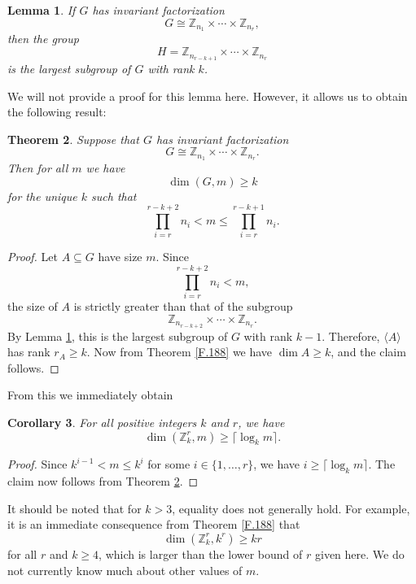 \documentclass[11pt]{article}
\newcommand{\Z}{\mathbb{Z}}
\newtheorem{thm}{Theorem}
\newtheorem{lem}[thm]{Lemma}
\newtheorem{cor}[thm]{Corollary}
\begin{document}
\begin{lem}\label{subgroup}
If $G$ has invariant factorization
\[G\cong\Z_{n_1}\times\cdots\times\Z_{n_r},\]
then the group
\[H=\Z_{n_{r-k+1}}\times\cdots\times\Z_{n_r}\]
\vspace{-1.5em}
\noindent is the largest subgroup of $G$ with rank $k$.
\end{lem}
\vspace{1.5em}
We will not provide a proof for this lemma here. However, it allows us to obtain the following result:
\begin{thm}\label{lower}
Suppose that $G$ has invariant factorization
\[G\cong\Z_{n_1}\times\cdots\times\Z_{n_r}.\]
Then for all $m$ we have
\[\dim(G, m)\geq k\]
for the unique $k$ such that 
\[\prod_{i=r}^{r-k+2}\!n_i<m\leq\prod_{i=r}^{r-k+1}\!n_i.\]
\end{thm}
\begin{proof}
    Let $A\subseteq G$ have size $m$. Since
    \[\prod_{i=r}^{r-k+2}\!n_i<m,\]
    the size of $A$ is strictly greater than that of the subgroup
    \[\Z_{n_{r-k+2}}\times\cdots\times\Z_{n_r}.\]
    By Lemma \ref{subgroup}, this is the largest subgroup of $G$ with rank $k-1$. Therefore, $\langle A \rangle$ has rank $r_A\geq k$. Now from Theorem \ref{F.188} we have $\dim A\geq k$, and the claim follows.
\end{proof}

\newpage
From this we immediately obtain

\begin{cor}\label{Zkr}
For all positive integers $k$ and $r$, we have
\[\dim(\Z_k^r,m)\geq \lceil \log_k m\rceil.\]
\end{cor}
\begin{proof}
Since $k^{i-1}<m\leq k^i$ for some $i\in\{1,\ldots,r\}$, we have $i\geq\lceil\log_k m\rceil$. The claim now follows from Theorem \ref{lower}.
\end{proof}

It should be noted that for $k>3$, equality does not generally hold. For example, it is an immediate consequence from Theorem \ref{F.188} that
\[\dim(\Z_k^r,k^r)\geq kr\]
for all $r$ and $k\geq4$, which is larger than the lower bound of $r$ given here. We do not currently know much about other values of $m$.
\end{document}
